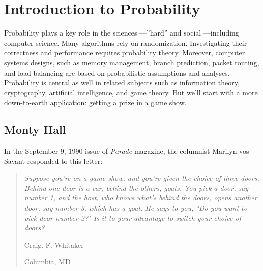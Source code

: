 \chapter{Introduction to Probability}\label{probability_chap}


Probability plays a key role in the sciences ---''hard'' and social
---including computer science.  Many algorithms rely on randomization.
Investigating their correctness and performance requires probability
theory.  Moreover, computer systems designs, such as memory management,
branch prediction, packet routing, and load balancing are based on
probabilistic assumptions and analyses.  Probability is central as well in
related subjects such as information theory, cryptography, artificial
intelligence, and game theory.  But we'll start with a more down-to-earth
application: getting a prize in a game show.

\section{Monty Hall}\label{monty_sec}

In the September 9, 1990 issue of \textit{Parade} magazine, the
columnist Marilyn vos Savant responded to this letter:


\begin{quotation}
\noindent \textit{Suppose you're on a game show, and you're given the
choice of three doors.  Behind one door is a car, behind the others,
goats.  You pick a door, say number 1, and the host, who knows what's
behind the doors, opens another door, say number 3, which has a goat.
He says to you, "Do you want to pick door number 2?"  Is it to your
advantage to switch your choice of doors?}

\vspace{1ex}

\hspace{3in} Craig. F. Whitaker

\hspace{3in} Columbia, MD
\end{quotation}

